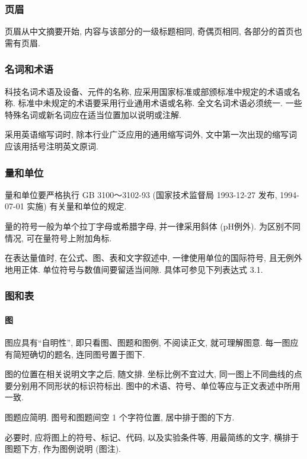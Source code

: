 \subsubsection{页眉}

页眉从中文摘要开始, 内容与该部分的一级标题相同, 奇偶页相同, 各部分的首页也需有页眉.

\subsubsection{名词和术语}

科技名词术语及设备、元件的名称, 应采用国家标准或部颁标准中规定的术语或名称. 标准中未规定的术语要采用行业通用术语或名称. 全文名词术语必须统一. 一些特殊名词或新名词应在适当位置加以说明或注解.

采用英语缩写词时, 除本行业广泛应用的通用缩写词外, 文中第一次出现的缩写词应该用括号注明英文原词.

\subsubsection{量和单位}

量和单位要严格执行 GB 3100～3102-93 (国家技术监督局 1993-12-27 发布, 1994-07-01 实施) 有关量和单位的规定.

量的符号一般为单个拉丁字母或希腊字母, 并一律采用斜体 (pH例外). 为区别不同情况, 可在量符号上附加角标.

在表达量值时, 在公式、图、表和文字叙述中, 一律使用单位的国际符号, 且无例外地用正体. 单位符号与数值间要留适当间隙. 具体可参见下列表达式 3.1.

\subsubsection{图和表}

\paragraph{图}
图应具有“自明性”, 即只看图、图题和图例, 不阅读正文, 就可理解图意. 每一图应有简短确切的题名, 连同图号置于图下.

图的位置在相关说明文字之后, 随文排. 坐标比例不宜过大, 同一图上不同曲线的点要分别用不同形状的标识符标出. 图中的术语、符号、单位等应与正文表述中所用一致.

图题应简明. 图号和图题间空 1 个字符位置, 居中排于图的下方.

必要时, 应将图上的符号、标记、代码, 以及实验条件等, 用最简练的文字, 横排于图题下方, 作为图例说明 (图注).

